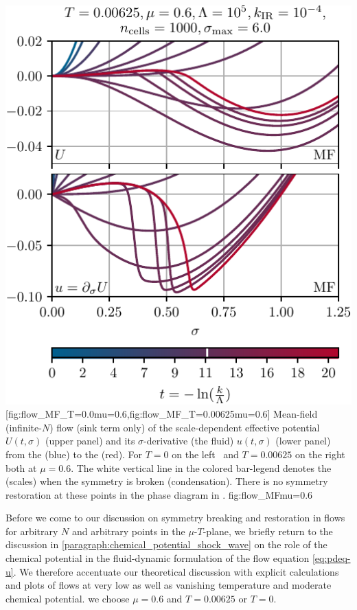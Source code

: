 	{\includegraphics[width=\subcaptionFigureWidth]{gn/figures/flow_MF_T=0.00625,mu=0.6.pdf}}%
	[fig:flow_MF_T=0.0mu=0.6,fig:flow_MF_T=0.00625mu=0.6] %
	{%
		Mean-field (infinite-$N$) \frg{} flow (sink term only) of the scale-dependent effective potential $U ( t, \sigma )$ (upper panel) and its $\sigma$-derivative (the fluid) $u ( t, \sigma )$ (lower panel) from the \uv{} ({blue}) to the \ir{} ({red}).
		For $T=0$ on the left~ and $T=0.00625$ on the right~ both at $\mu=0.6$.
		The white vertical line in the colored bar-legend denotes the \rgtime{} (scales) when the \ZII{} symmetry is broken (condensation).
		There is no symmetry restoration at these points in the phase diagram in \mf{}.
	}%
	{fig:flow_MFmu=0.6}%
	
Before we come to our discussion on symmetry breaking and restoration in \frg{} flows for arbitrary $N$ and arbitrary points in the $\mu$-$T$-plane, we briefly return to the discussion in \cref{paragraph:chemical_potential_shock_wave} on the role of the chemical potential in the fluid-dynamic formulation of the \frg{} flow equation \eqref{eq:pdeq-u}. We therefore accentuate our theoretical discussion with explicit calculations and plots of \frg{} flows at very low as well as vanishing temperature and moderate chemical potential. \WlogA{} we choose $\mu = 0.6$ and $T = 0.00625$ or $T = 0$.\bigskip

